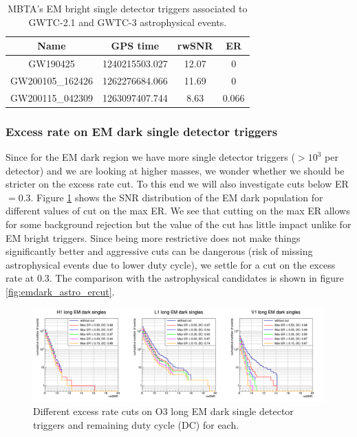 \begin{table}
  \centering
  \begin{tabular}{c|c|c|c}
    Name & GPS time & rwSNR & ER \\ \hline
    GW190425 & 1240215503.027 & 12.07 & 0 \\
    GW200105\_162426 & 1262276684.066 & 11.69 & 0 \\
    GW200115\_042309 & 1263097407.744 & 8.63 & 0.066 \\
  \end{tabular}
  \caption{MBTA's EM bright single detector triggers associated to GWTC-2.1 and GWTC-3 astrophysical events.}
  \label{tab:astro}
\end{table}




\clearpage\newpage
\subsubsection{Excess rate on EM dark single detector triggers}
\label{sec:emdark_er}

Since for the EM dark region we have more single detector triggers ($>10^3$ per detector) and we are looking at higher masses, we wonder whether we should be stricter on the excess rate cut.
To this end we will also investigate cuts below ER $=0.3$.
Figure \ref{fig:emdark_ercut} shows the SNR distribution of the EM dark population for different values of cut on the max ER.
We see that cutting on the max ER allows for some background rejection but the value of the cut has little impact unlike for EM bright triggers.
Since being more restrictive does not make things significantly better and aggressive cuts can be dangerous (risk of missing astrophysical events due to lower duty cycle), we settle for a cut on the excess rate at 0.3.
The comparison with the astrophysical candidates is shown in figure \ref{fig:emdark_astro_ercut}.
\begin{figure}
  \centering
  \includegraphics[width=\linewidth]{sectionSelection/plotsEMdark/cCumulERcut.png}
  \caption{Different excess rate cuts on O3 long EM dark single detector triggers and remaining duty cycle (DC) for each.}
  \label{fig:emdark_ercut}
\end{figure}

